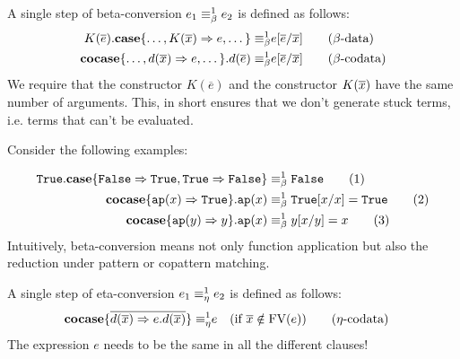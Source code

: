 \documentclass[twoside,12pt,a4paper]{article}
\begin{document}
\begin{definition} \label{sec:betaconv}
    A single step of beta-conversion $e_1 \equiv_{\beta}^1 e_2$ is defined as follows:
    \begin{align*}
        K(\overline{e}).\textbf{case}\{\dots,K(\overline{x})\Rightarrow e,\dots\} 
        \equiv_{\beta}^1 & e[\overline{e}/\overline{x}] \tag{$\beta$-data}\\
        \textbf{cocase}\{\dots,d(\overline{x}) \Rightarrow e, \dots\}.d(\overline{e})
        \equiv_{\beta}^1 & e[\overline{e}/\overline{x}]  \tag{$\beta$-codata}
    \end{align*}
    We require that the constructor $K(\overline{e})$ and the constructor $K(\overline{x})$ have the same number of arguments.
    This, in short ensures that we don't generate stuck terms, i.e. terms that can't be evaluated. %
\end{definition}
Consider the following examples:
\begin{example}
    \begin{align*}
        \mathtt{True}.\textbf{case}\{\mathtt{False}\Rightarrow \mathtt{True}, \mathtt{True} \Rightarrow \mathtt{False}\}&\equiv_{\beta}^1\mathtt{False}\tag{1}\\
        \textbf{cocase}\{\texttt{ap}(x)\Rightarrow \mathtt{True}\}.\texttt{ap}(x)&\equiv_{\beta}^1 \mathtt{True}[x/x] = \mathtt{True} \tag{2}\\
        \textbf{cocase}\{\texttt{ap}(y)\Rightarrow y\}.\texttt{ap}(x) &\equiv_{\beta}^1 y[x/y]= x\tag{3}
    \end{align*}
    Intuitively, beta-conversion means not only function application but also the reduction under pattern or copattern matching. %
\end{example}


\begin{definition}
    A single step of eta-conversion $e_1 \equiv_{\eta}^1 e_2$ is defined as follows:
    \begin{align*}
        \textbf{cocase}\{\overline{d(\overline{x})\Rightarrow e.d(\overline{x})}\}
        \equiv_{\eta}^1 & e \quad (\text{if } \overline{x}\notin \text{FV}(e)) \tag{$\eta$-codata}
    \end{align*}
    The expression $e$ needs to be the same in all the different clauses!
\end{definition}
\end{document}
